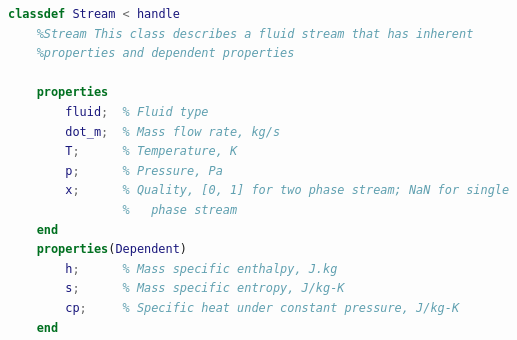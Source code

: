 \begin{lstlisting}[language= MATLAB, backgroundcolor = \color{yellow!20}, label = {lst:MATLAB_SOURCECODE}]
classdef Stream < handle
    %Stream This class describes a fluid stream that has inherent
    %properties and dependent properties
    
    properties
        fluid;  % Fluid type
        dot_m;  % Mass flow rate, kg/s
        T;      % Temperature, K
        p;      % Pressure, Pa
        x;      % Quality, [0, 1] for two phase stream; NaN for single 
                %   phase stream
    end
    properties(Dependent)
        h;      % Mass specific enthalpy, J.kg
        s;      % Mass specific entropy, J/kg-K
        cp;     % Specific heat under constant pressure, J/kg-K
    end
    

\end{lstlisting}
